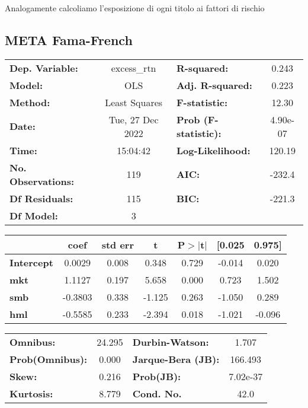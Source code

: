 \documentclass{report}
\begin{document}
Analogamente calcoliamo l'esposizione di ogni titolo ai fattori di rischio

\subsection{META Fama-French}
\begin{center}
\begin{tabular}{lclc}
\toprule
\textbf{Dep. Variable:}    &   excess\_rtn    & \textbf{  R-squared:         } &     0.243   \\
\textbf{Model:}            &       OLS        & \textbf{  Adj. R-squared:    } &     0.223   \\
\textbf{Method:}           &  Least Squares   & \textbf{  F-statistic:       } &     12.30   \\
\textbf{Date:}             & Tue, 27 Dec 2022 & \textbf{  Prob (F-statistic):} &  4.90e-07   \\
\textbf{Time:}             &     15:04:42     & \textbf{  Log-Likelihood:    } &    120.19   \\
\textbf{No. Observations:} &         119      & \textbf{  AIC:               } &    -232.4   \\
\textbf{Df Residuals:}     &         115      & \textbf{  BIC:               } &    -221.3   \\
\textbf{Df Model:}         &           3      & \textbf{                     } &             \\
\bottomrule
\end{tabular}
\begin{tabular}{lcccccc}
                   & \textbf{coef} & \textbf{std err} & \textbf{t} & \textbf{P$> |$t$|$} & \textbf{[0.025} & \textbf{0.975]}  \\
\midrule
\textbf{Intercept} &       0.0029  &        0.008     &     0.348  &         0.729        &       -0.014    &        0.020     \\
\textbf{mkt}       &       1.1127  &        0.197     &     5.658  &         0.000        &        0.723    &        1.502     \\
\textbf{smb}       &      -0.3803  &        0.338     &    -1.125  &         0.263        &       -1.050    &        0.289     \\
\textbf{hml}       &      -0.5585  &        0.233     &    -2.394  &         0.018        &       -1.021    &       -0.096     \\
\bottomrule
\end{tabular}
\begin{tabular}{lclc}
\textbf{Omnibus:}       & 24.295 & \textbf{  Durbin-Watson:     } &    1.707  \\
\textbf{Prob(Omnibus):} &  0.000 & \textbf{  Jarque-Bera (JB):  } &  166.493  \\
\textbf{Skew:}          &  0.216 & \textbf{  Prob(JB):          } & 7.02e-37  \\
\textbf{Kurtosis:}      &  8.779 & \textbf{  Cond. No.          } &     42.0  \\
\bottomrule
\end{tabular}

\end{center}
\end{document}
